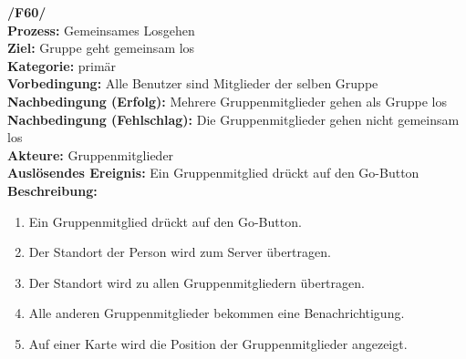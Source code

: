 \textbf{/F60/} \\
\textbf{Prozess:} Gemeinsames Losgehen \\
\textbf{Ziel:} Gruppe geht gemeinsam los \\
\textbf{Kategorie:} primär \\
\textbf{Vorbedingung:} Alle Benutzer sind Mitglieder der selben Gruppe \\
\textbf{Nachbedingung (Erfolg):} Mehrere Gruppenmitglieder gehen als Gruppe los\\
\textbf{Nachbedingung (Fehlschlag):} Die Gruppenmitglieder gehen nicht gemeinsam los\\
\textbf{Akteure:} Gruppenmitglieder \\
\textbf{Auslösendes Ereignis:} Ein Gruppenmitglied drückt auf den Go-Button\\
\textbf{Beschreibung:}
\begin{enumerate}
\setlength{\itemsep}{0pt}
\item Ein Gruppenmitglied drückt auf den Go-Button.
\item Der Standort der Person wird zum Server übertragen.
\item Der Standort wird zu allen Gruppenmitgliedern übertragen.
\item Alle anderen Gruppenmitglieder bekommen eine Benachrichtigung.
\item Auf einer Karte wird die Position der Gruppenmitglieder angezeigt.
\end{enumerate}

